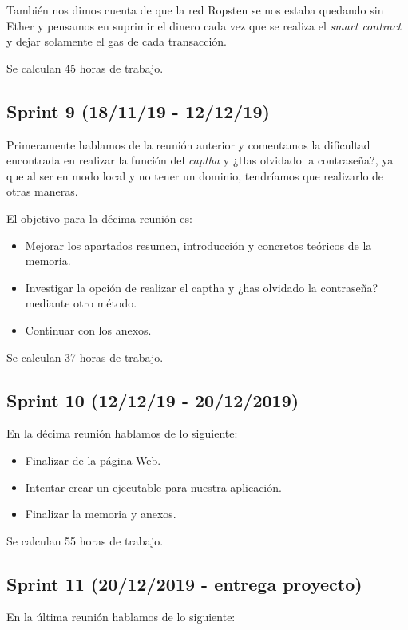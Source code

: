 También nos dimos cuenta de que la red Ropsten se nos estaba quedando sin Ether y pensamos en suprimir el dinero cada vez que se realiza el \textit{smart contract} y dejar solamente el gas de cada transacción.

Se calculan 45 horas de trabajo.

\subsection{Sprint 9 (18/11/19 - 12/12/19)}

Primeramente hablamos de la reunión anterior y comentamos la dificultad encontrada en realizar la función del \textit{captha} y ¿Has olvidado la contraseña?, ya que al ser en modo local y no tener un dominio, tendríamos que realizarlo de otras maneras.

El objetivo para la décima reunión es:

\begin{itemize}
	\item Mejorar los apartados resumen, introducción y concretos teóricos de la memoria.
	\item Investigar la opción de realizar el captha y ¿has olvidado la contraseña? mediante otro método.
	\item Continuar con los anexos.
\end{itemize}

Se calculan 37 horas de trabajo.


\subsection{Sprint 10 (12/12/19 - 20/12/2019)}

En la décima reunión hablamos de lo siguiente:

\begin{itemize}
	\item Finalizar de la página Web.
	\item Intentar crear un ejecutable para nuestra aplicación.
	\item Finalizar la memoria y anexos.
\end{itemize}

Se calculan 55 horas de trabajo.

\subsection{Sprint 11 (20/12/2019 - entrega proyecto)}

En la última reunión hablamos de lo siguiente:

